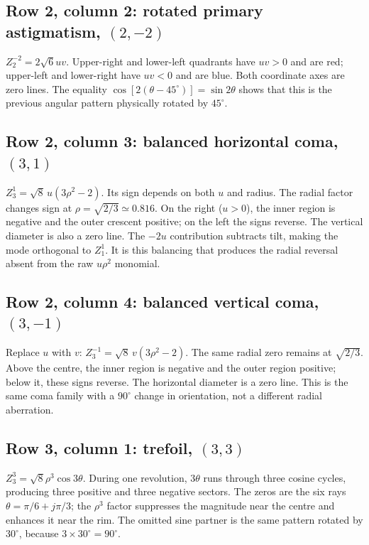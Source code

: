 \subsection*{Row 2, column 2: rotated primary astigmatism, $(2,-2)$}
$Z_2^{-2}=2\sqrt6uv$. Upper-right and lower-left quadrants have $uv>0$ and are red; upper-left and lower-right have $uv<0$ and are blue. Both coordinate axes are zero lines. The equality
$\cos[2(\theta-45^\circ)]=\sin2\theta$ shows that this is the previous angular pattern physically rotated by $45^\circ$.

\subsection*{Row 2, column 3: balanced horizontal coma, $(3,1)$}
$Z_3^1=\sqrt8\,u(3\rho^2-2)$. Its sign depends on both $u$ and radius. The radial factor changes sign at $\rho=\sqrt{2/3}\simeq0.816$. On the right ($u>0$), the inner region is negative and the outer crescent positive; on the left the signs reverse. The vertical diameter is also a zero line. The $-2u$ contribution subtracts tilt, making the mode orthogonal to $Z_1^1$. It is this balancing that produces the radial reversal absent from the raw $u\rho^2$ monomial.

\subsection*{Row 2, column 4: balanced vertical coma, $(3,-1)$}
Replace $u$ with $v$: $Z_3^{-1}=\sqrt8\,v(3\rho^2-2)$. The same radial zero remains at $\sqrt{2/3}$. Above the centre, the inner region is negative and the outer region positive; below it, these signs reverse. The horizontal diameter is a zero line. This is the same coma family with a $90^\circ$ change in orientation, not a different radial aberration.

\subsection*{Row 3, column 1: trefoil, $(3,3)$}
$Z_3^3=\sqrt8\rho^3\cos3\theta$. During one revolution, $3\theta$ runs through three cosine cycles, producing three positive and three negative sectors. The zeros are the six rays $\theta=\pi/6+j\pi/3$; the $\rho^3$ factor suppresses the magnitude near the centre and enhances it near the rim. The omitted sine partner is the same pattern rotated by $30^\circ$, because $3\times30^\circ=90^\circ$.

